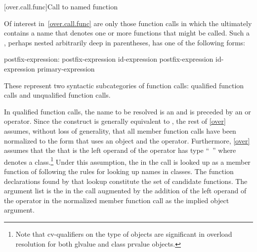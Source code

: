 [over.call.func]{Call to named function}

\pnum
Of interest in~\ref{over.call.func} are only those function calls in
which the
ultimately contains a name that
denotes one or more functions that might be called.
Such a
,
perhaps nested arbitrarily deep in
parentheses, has one of the following forms:

\begin{ncbnf}
postfix-expression:\br
    postfix-expression  id-expression\br
    postfix-expression \terminal{->} id-expression\br
    primary-expression
\end{ncbnf}

These represent two syntactic subcategories of function calls:
qualified function calls and unqualified function calls.

\pnum
In qualified function calls, the name to be resolved is an
and is preceded by an
\tcode{->}
or
operator.
Since the
construct
is generally equivalent to
,
the rest of
\ref{over} assumes, without loss of generality, that all member
function calls have been normalized to the form that uses an
object and the
operator.
Furthermore, \ref{over} assumes that
the
that is the left operand of the
operator
has type ``\cv{}~''
where
denotes a class.\footnote{Note that cv-qualifiers on the type of objects are
significant in overload
resolution for
both glvalue and class prvalue objects.}
Under this
assumption, the
in the call is looked up as a
member function of
following the rules for looking up names in
classes.
The function declarations found by that lookup constitute the set of
candidate functions.
The argument list is the
in the call augmented by the addition of the left operand of
the
operator in the normalized member function call as the
implied object argument.

